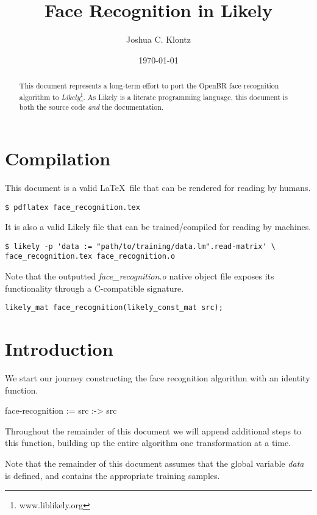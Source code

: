 \documentclass{article}
\title{Face Recognition in Likely}
\author{Joshua C. Klontz}
\date{\today}
\begin{document}
\maketitle

\begin{abstract}
This document represents a long-term effort to port the OpenBR face recognition algorithm to \emph{Likely}\footnote{www.liblikely.org}.
As Likely is a literate programming language, this document is both the source code \emph{and} the documentation.
\end{abstract}

\section{Compilation}
This document is a valid \LaTeX\ file that can be rendered for reading by humans.

\begin{verbatim}
$ pdflatex face_recognition.tex
\end{verbatim}

It is also a valid Likely file that can be trained/compiled for reading by machines.

\begin{verbatim}
$ likely -p 'data := "path/to/training/data.lm".read-matrix' \
face_recognition.tex face_recognition.o
\end{verbatim}

Note that the outputted \emph{face\_recognition.o} native object file exposes its functionality through a C-compatible signature.

\begin{verbatim}
likely_mat face_recognition(likely_const_mat src);
\end{verbatim}

\section{Introduction}
We start our journey constructing the face recognition algorithm with an identity function.

\begin{likely}
face-recognition :=
  src :->
    src
\end{likely}

Throughout the remainder of this document we will append additional steps to this function, building up the entire algorithm one transformation at a time.

Note that the remainder of this document assumes that the global variable \emph{data} is defined, and contains the appropriate training samples.
\end{document}
